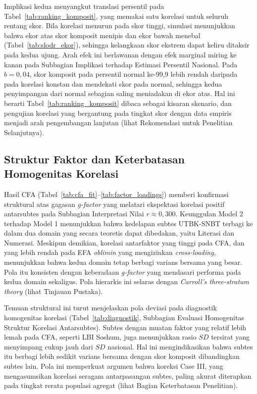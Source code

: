 Implikasi kedua menyangkut translasi persentil pada Tabel~\ref{tab:ranking_komposit}, yang memakai satu korelasi untuk seluruh rentang skor. Bila korelasi menurun pada skor tinggi, simulasi menunjukkan bahwa ekor atas skor komposit menipis dan ekor bawah menebal (Tabel~\ref{tab:slodr_ekor}), sehingga kelangkaan skor ekstrem dapat keliru ditaksir pada kedua ujung. Arah efek ini berlawanan dengan efek marginal miring ke kanan pada Subbagian Implikasi terhadap Estimasi Persentil Nasional. Pada $b = 0,04$, skor komposit pada persentil normal ke-99,9 lebih rendah daripada pada korelasi konstan dan mendekati skor pada normal, sehingga kedua penyimpangan dari normal sebagian saling meniadakan di ekor atas. Hal ini berarti Tabel~\ref{tab:ranking_komposit} dibaca sebagai kisaran skenario, dan pengujian korelasi yang bergantung pada tingkat skor dengan data empiris menjadi arah pengembangan lanjutan (lihat Rekomendasi untuk Penelitian Selanjutnya).

\subsection{Struktur Faktor dan Keterbatasan Homogenitas Korelasi}
Hasil CFA (Tabel~\ref{tab:cfa_fit}--\ref{tab:factor_loadings}) memberi konfirmasi struktural atas gagasan \textit{g-factor} yang melatari ekspektasi korelasi positif antarsubtes pada Subbagian Interpretasi Nilai $r \approx 0,300$. Keunggulan Model 2 terhadap Model 1 menunjukkan bahwa kedelapan subtes UTBK-SNBT terbagi ke dalam dua domain yang secara teoretis dapat dibedakan, yaitu Literasi dan Numerasi. Meskipun demikian, korelasi antarfaktor yang tinggi pada CFA, dan yang lebih rendah pada EFA \textit{oblimin} yang mengizinkan \textit{cross-loading}, menunjukkan bahwa kedua domain tetap berbagi varians bersama yang besar. Pola itu konsisten dengan keberadaan \textit{g-factor} yang mendasari performa pada kedua domain sekaligus. Pola hierarkis ini selaras dengan \textit{Carroll's three-stratum theory} \autocite{carroll1993} (lihat Tinjauan Pustaka).

Temuan struktural ini turut menjelaskan pola deviasi pada diagnostik homogenitas korelasi (Tabel~\ref{tab:diagnostik}, Subbagian Evaluasi Homogenitas Struktur Korelasi Antarsubtes). Subtes dengan muatan faktor yang relatif lebih lemah pada CFA, seperti LBI Soshum, juga menunjukkan rasio $SD$ tersirat yang menyimpang cukup jauh dari $SD$ nasional. Hal ini mengindikasikan bahwa subtes itu berbagi lebih sedikit varians bersama dengan skor komposit dibandingkan subtes lain. Pola ini memperkuat argumen bahwa koreksi Case III, yang mengasumsikan korelasi seragam antarpasangan subtes, paling akurat diterapkan pada tingkat rerata populasi agregat (lihat Bagian Keterbatasan Penelitian).

